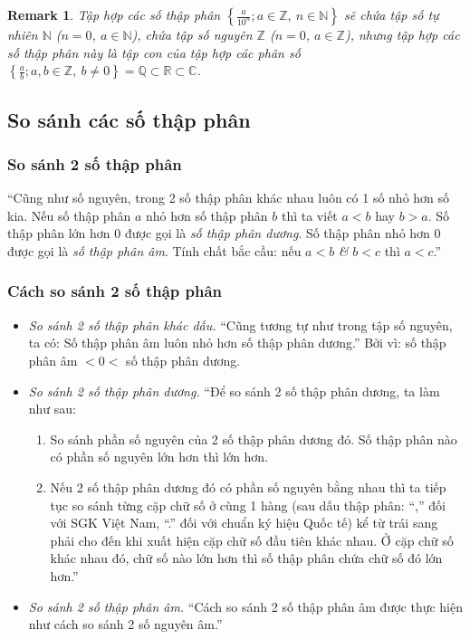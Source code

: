\documentclass[oneside]{book}
\numberwithin{equation}{section}
\newtheorem{remark}{Remark}[section]
\begin{document}
\begin{remark}
	Tập hợp các số thập phân $\left\{\frac{a}{10^n};a\in\mathbb{Z},\ n\in\mathbb{N}\right\}$ sẽ chứa tập số tự nhiên $\mathbb{N}$ ($n = 0$, $a\in\mathbb{N}$), chứa tập số nguyên $\mathbb{Z}$ ($n = 0$, $a\in\mathbb{Z}$), nhưng tập hợp các số thập phân này là tập con của tập hợp các phân số $\left\{\frac{a}{b};a,b\in\mathbb{Z},\ b\ne 0\right\} = \mathbb{Q}\subset\mathbb{R}\subset\mathbb{C}$.
\end{remark}

\subsection{So sánh các số thập phân}

\subsubsection{So sánh 2 số thập phân}
``Cũng như số nguyên, trong 2 số thập phân khác nhau luôn có 1 số nhỏ hơn số kia. Nếu số thập phân $a$ nhỏ hơn số thập phân $b$ thì ta viết $a < b$ hay $b > a$. Số thập phân lớn hơn 0 được gọi là \emph{số thập phân dương}. Số thập phân nhỏ hơn 0 được gọi là \emph{số thập phân âm}. Tính chất bắc cầu: nếu $a < b$ \textit{\&} $b < c$ thì $a < c$.'' \cite[p. 45]{Thai_Anh_Dat_Ha_Loan_Nam_Quang_Toan_6_tap_2}

\subsubsection{Cách so sánh 2 số thập phân}
\begin{itemize}
	\item \textit{So sánh 2 số thập phân khác dấu.} ``Cũng tương tự như trong tập số nguyên, ta có: Số thập phân âm luôn nhỏ hơn số thập phân dương.'' Bởi vì: số thập phân âm $< 0 <$ số thập phân dương.
	\item \textit{So sánh 2 số thập phân dương.} ``Để so sánh 2 số thập phân dương, ta làm như sau:
	\begin{enumerate}
		\item So sánh phần số nguyên của 2 số thập phân dương đó. Số thập phân nào có phần số nguyên lớn hơn thì lớn hơn.
		\item Nếu 2 số thập phân dương đó có phần số nguyên bằng nhau thì ta tiếp tục so sánh từng cặp chữ số ở cùng 1 hàng (sau dấu thập phân: ``,'' đối với SGK Việt Nam, ``.'' đối với chuẩn ký hiệu Quốc tế) kể từ trái sang phải cho đến khi xuất hiện cặp chữ số đầu tiên khác nhau. Ở cặp chữ số khác nhau đó, chữ số nào lớn hơn thì số thập phân chứa chữ số đó lớn hơn.'' 
	\end{enumerate}
	\item \textit{So sánh 2 số thập phân âm.} ``Cách so sánh 2 số thập phân âm được thực hiện như cách so sánh 2 số nguyên âm.'' 
\end{itemize}
\end{document}
